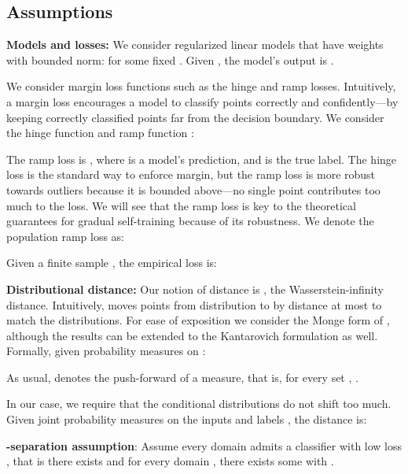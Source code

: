 \documentclass[11pt]{article}
\newcommand{\tengyu}[1]{}
\newcommand{\ak}[1]{}
\begin{document}
\subsection{Assumptions}

\textbf{Models and losses:} We consider regularized linear models that have weights with bounded  norm:  for some fixed . Given , the model's output is .

We consider margin loss functions such as the hinge and ramp losses. Intuitively, a margin loss encourages a model to classify points correctly and confidently---by keeping correctly classified points far from the decision boundary. We consider the hinge function  and ramp function :

The ramp loss is , where  is a model's prediction, and  is the true label.
The hinge loss is the standard way to enforce margin, but the ramp loss is more robust towards outliers because it is bounded above---no single point contributes too much to the loss.
We will see that the ramp loss is key to the theoretical guarantees for gradual self-training because of its robustness.
We denote the population ramp loss as:

\tengyu{would it be easier if we just write }
\ak{Ah I think this will be inconsistent with the self-training algorithm definition though, in the setup}
Given a finite sample , the empirical loss is:



\textbf{Distributional distance:} Our notion of distance is , the Wasserstein-infinity distance.
Intuitively,  moves points from distribution  to  by distance at most  to match the distributions.
For ease of exposition we consider the Monge form of , although the results can be extended to the Kantarovich formulation as well.
Formally, given probability measures  on :


As usual,  denotes the push-forward of a measure, that is, for every set , .

In our case, we require that the conditional distributions do not shift too much. Given joint probability measures  on the inputs and labels , the distance is:


\newcommand{\sepAssump}{-separation}
\newcommand{\noLabShiftAssump}{no label shift}
\newcommand{\NoLabShiftAssump}{No label shift}
\newcommand{\gradShiftAssump}{gradual shift}
\newcommand{\GradShiftAssump}{Gradual shift}
\newcommand{\boundedAssump}{bounded data}
\newcommand{\BoundedAssump}{Bounded data}

\textbf{\sepAssump{} assumption}: Assume every domain admits a classifier with low loss , that is there exists  and for every domain , there exists some  with .
\end{document}
